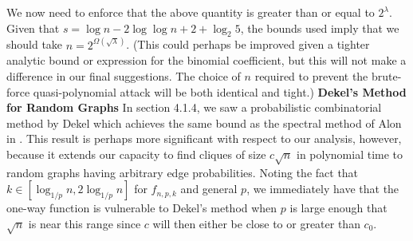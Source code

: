\documentclass{article}
\theoremstyle{definition}
\begin{document}
\noindent We now need to enforce that the above quantity is greater 
than or equal to $2^\lambda$.  Given that 
$s = \log{n} - 2\log\log{n} + 2 + \log_2{5}$, the bounds used imply that we 
should take $n = 2^{\Omega(\sqrt{\lambda})}$. (This could perhaps be improved 
given a tighter analytic bound or expression for the binomial coefficient, 
but this will not make a difference in our final suggestions.  The choice of 
$n$ required to prevent the brute-force quasi-polynomial attack will 
be both identical and tight.)
\newline\newline
\noindent \textbf{Dekel's Method for Random Graphs } In section 4.1.4, we 
saw a probabilistic combinatorial method by Dekel which achieves the same bound 
as the spectral method of Alon in \cite{Spectral}.  This result is perhaps 
more significant with respect to our analysis, however, because it extends 
our capacity to find cliques of size $c \sqrt{n}$ in polynomial time to 
random graphs having arbitrary edge probabilities.  Noting the fact that 
$k \in [ \log_{1/p}{n}, 2\log_{1/p}{n} ]$ for $f_{n,p,k}$ and general $p$, 
we immediately have that the one-way function is vulnerable to Dekel's method 
when $p$ is large enough that $\sqrt{n}$ is near this range since $c$ will 
then either be close to or greater than $c_0$.
\end{document}

